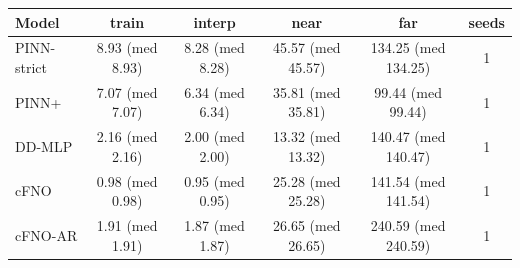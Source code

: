 \begin{tabular}{lccccc}
\toprule
Model & train & interp & near & far & seeds \\
\midrule
PINN-strict & 8.93 (med 8.93) & 8.28 (med 8.28) & 45.57 (med 45.57) & 134.25 (med 134.25) & 1 \\
PINN+ & 7.07 (med 7.07) & 6.34 (med 6.34) & 35.81 (med 35.81) & 99.44 (med 99.44) & 1 \\
DD-MLP & 2.16 (med 2.16) & 2.00 (med 2.00) & 13.32 (med 13.32) & 140.47 (med 140.47) & 1 \\
cFNO & 0.98 (med 0.98) & 0.95 (med 0.95) & 25.28 (med 25.28) & 141.54 (med 141.54) & 1 \\
cFNO-AR & 1.91 (med 1.91) & 1.87 (med 1.87) & 26.65 (med 26.65) & 240.59 (med 240.59) & 1 \\
\bottomrule
\end{tabular}
